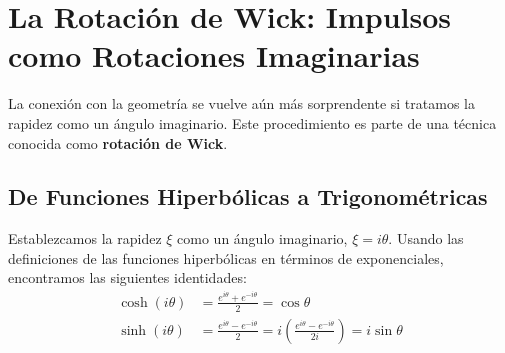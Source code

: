 \documentclass[11pt,a4paper]{article}
\begin{document}
\section{La Rotación de Wick: Impulsos como Rotaciones Imaginarias}

La conexión con la geometría se vuelve aún más sorprendente si tratamos la rapidez como un ángulo imaginario. Este procedimiento es parte de una técnica conocida como \textbf{rotación de Wick}.

\subsection{De Funciones Hiperbólicas a Trigonométricas}
Establezcamos la rapidez $\xi$ como un ángulo imaginario, $\xi = i\theta$. Usando las definiciones de las funciones hiperbólicas en términos de exponenciales, encontramos las siguientes identidades:
\begin{align*}
    \cosh(i\theta) &= \frac{e^{i\theta} + e^{-i\theta}}{2} = \cos\theta \\
    \sinh(i\theta) &= \frac{e^{i\theta} - e^{-i\theta}}{2} = i \left( \frac{e^{i\theta} - e^{-i\theta}}{2i} \right) = i\sin\theta
\end{align*}
\end{document}
